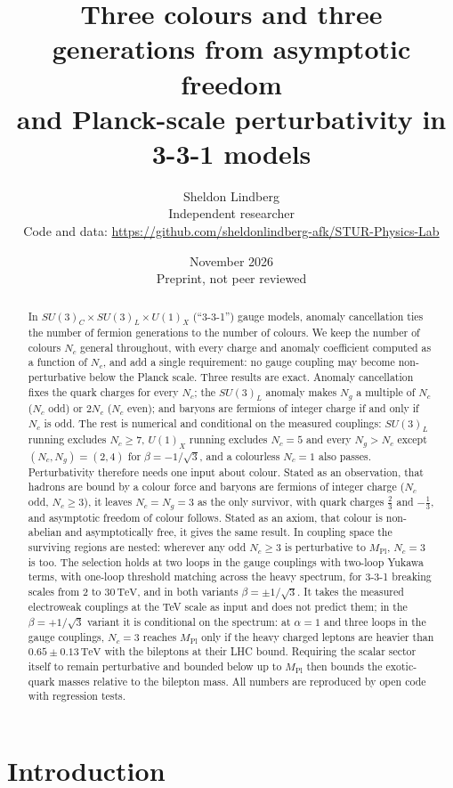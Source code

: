 \documentclass[11pt,a4paper]{article}
\title{Three colours and three generations from asymptotic freedom\\and Planck-scale perturbativity in 3-3-1 models}
\author{Sheldon Lindberg\\[2pt]\small Independent researcher\\[2pt]
\small Code and data: \url{https://github.com/sheldonlindberg-afk/STUR-Physics-Lab}}
\date{November 2026\\[4pt]\small Preprint, not peer reviewed}
\newcommand{\Nc}{N_c}
\newcommand{\Ng}{N_g}
\newcommand{\MPl}{M_{\mathrm{Pl}}}
\newcommand{\TeV}{\,\mathrm{TeV}}
\begin{document}
\maketitle

\begin{abstract}
In $SU(3)_C\times SU(3)_L\times U(1)_X$ (``3-3-1'') gauge models, anomaly cancellation
ties the number of fermion generations to the number of colours. We keep the number of
colours $\Nc$ general throughout, with every charge and anomaly coefficient computed as
a function of $\Nc$, and add a single requirement: no gauge coupling may become
non-perturbative below the Planck scale. Three results are exact. Anomaly cancellation
fixes the quark charges for every $\Nc$; the $SU(3)_L$ anomaly makes $\Ng$ a multiple of
$\Nc$ ($\Nc$ odd) or $2\Nc$ ($\Nc$ even); and baryons are fermions of integer charge if
and only if $\Nc$ is odd. The rest is numerical and conditional on the measured couplings:
$SU(3)_L$ running excludes $\Nc\ge 7$, $U(1)_X$ running excludes $\Nc=5$ and every
$\Ng>\Nc$ except $(\Nc,\Ng)=(2,4)$ for $\beta=-1/\sqrt3$, and a colourless $\Nc=1$ also
passes. Perturbativity therefore needs one input about colour. Stated as an observation,
that hadrons are bound by a colour force and baryons are fermions of integer charge
($\Nc$ odd, $\Nc\ge3$), it leaves $\Nc=\Ng=3$ as the only survivor, with quark charges
$\tfrac23$ and $-\tfrac13$, and asymptotic freedom of colour follows. Stated as an axiom,
that colour is non-abelian and asymptotically free, it gives the same result. In coupling
space the surviving regions are nested: wherever any odd $\Nc\ge3$ is perturbative to
$\MPl$, $\Nc=3$ is too. The selection holds at two loops in the gauge couplings with
two-loop Yukawa terms, with one-loop threshold matching across the heavy spectrum, for
3-3-1 breaking scales from 2 to $30\TeV$, and in both variants $\beta=\pm1/\sqrt3$. It
takes the measured electroweak couplings at the TeV scale as input and does not predict
them; in the $\beta=+1/\sqrt3$ variant it is conditional on the spectrum: at $\alpha=1$
and three loops in the gauge couplings, $\Nc=3$ reaches $\MPl$ only if the heavy charged
leptons are heavier than $0.65\pm0.13\TeV$ with the bileptons at their LHC bound. Requiring the scalar sector itself to remain perturbative and bounded below
up to $\MPl$ then bounds the exotic-quark masses relative to the bilepton mass. All
numbers are reproduced by open code with regression tests.
\end{abstract}

\section{Introduction}
\end{document}
